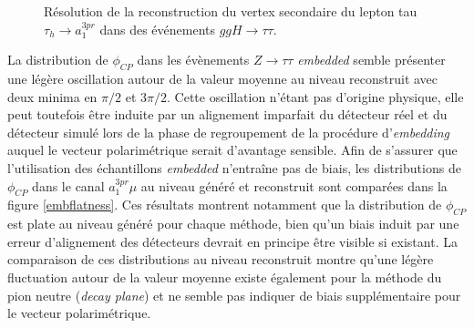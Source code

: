 \begin{figure}
\caption{Résolution de la reconstruction du vertex secondaire du lepton tau $\tau_h\to a_1^{3pr}$ dans des événements $ggH\to\tau\tau$.}
\label{SVreso}
\end{figure}

La distribution de $\phi_{CP}$ dans les évènements $Z\to\tau\tau$ \textit{embedded} semble présenter une légère oscillation autour de la valeur moyenne au niveau reconstruit avec deux minima en $\pi/2$ et $3\pi/2$. Cette oscillation n'étant pas d'origine physique, elle peut toutefois être induite par un alignement imparfait du détecteur réel et du détecteur simulé lors de la phase de regroupement de la procédure d'\textit{embedding} auquel le vecteur polarimétrique serait d'avantage sensible. Afin de s'assurer que l'utilisation des échantillons \textit{embedded} n'entraîne pas de biais, les distributions de $\phi_{CP}$ dans le canal $a_1^{3pr}\mu$ au niveau généré et reconstruit sont comparées dans la figure \ref{embflatness}. Ces résultats montrent notamment que la distribution de $\phi_{CP}$ est plate au niveau généré pour chaque méthode, bien qu'un biais induit par une erreur d'alignement des détecteurs devrait en principe être visible si existant. La comparaison de ces distributions au niveau reconstruit montre qu'une légère fluctuation autour de la valeur moyenne existe également pour la méthode du pion neutre (\textit{decay plane}) et ne semble pas indiquer de biais supplémentaire pour le vecteur polarimétrique.

